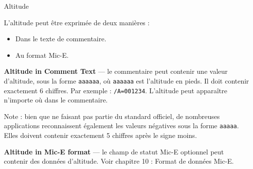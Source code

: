 \begin{aprssideblock}{Altitude}
\label{altitude}
L'altitude peut être exprimée de deux manières :

\begin{itemize}
\tightlist
\item
  Dans le texte de commentaire.
\item
  Au format Mic-E.
\end{itemize}

\textbf{Altitude in Comment Text} --- le commentaire peut contenir une
valeur d'altitude, sous la forme \texttt{aaaaaa}, où
\texttt{aaaaaa} est l'altitude en pieds. Il doit contenir exactement
6 chiffres. Par exemple : \texttt{/A=001234}. L'altitude peut
apparaître n'importe où dans le commentaire.

Note : bien que ne faisant pas partie du standard officiel, de
nombreuses applications reconnaissent également les valeurs négatives
sous la forme \texttt{aaaaa}. Elles doivent contenir
exactement 5 chiffres après le signe moins.

\textbf{Altitude in Mic-E format} --- le champ de statut Mic-E optionnel
peut contenir des données d'altitude. Voir chapitre 10 : Format de
données Mic-E.
\end{aprssideblock}
